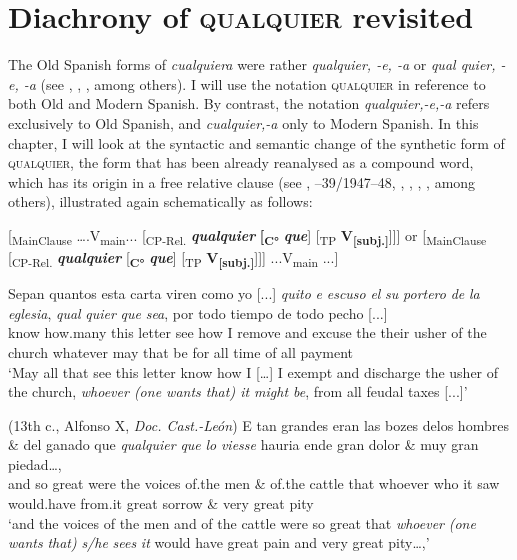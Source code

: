 \chapter{{Diachrony} {of} {\textsc{qualquier} }{revisited}}\label{sec:5}

The Old Spanish forms of \textit{cualquiera} were rather \textit{qualquier, -e, -a} or \textit{qual quier, -e, -a} (see \citealt{cp2009}, \citealt{Pato2012}, \citealt{Mackenzie2019}, among others). I will use the notation \textsc{qualquier} in reference to both Old and Modern Spanish. By contrast, the notation \textit{qualquier,-e,-a} refers exclusively to Old Spanish, and \textit{cualquier,-a} only to Modern Spanish. In this chapter, I will look at the syntactic and semantic change of the synthetic form of \textsc{qualquier}, the form that has been already reanalysed as a compound word, which has its origin in a free relative clause (see \citealt{Palomo1934}, \citealt{Lombard1938}–39/1947–48, \citealt{Meier1950}, \citealt{Rivero1988}, \cite{Espinosa2006}, \citealt{cp2009}, among others), illustrated again schematically as follows:

\ea \label{ex:key:272} %
\ea{} \label{ex:key:272-1}  [\textsubscript{MainClause} ….V\textsubscript{main}... [\textsubscript{CP-Rel.} \textbf{\textit{qualquier} }\textbf{[\textsubscript{C°}} \textbf{\textit{que}}] [\textsubscript{TP} \textbf{V\textsubscript{[subj.]}}]]] or
\ex{} \label{ex:key:272-2}  [\textsubscript{MainClause} [\textsubscript{CP-Rel.} \textbf{\textit{qualquier} }[\textbf{\textsubscript{C°}} \textbf{\textit{que}}] [\textsubscript{TP} \textbf{V\textsubscript{[subj.]}}]]] ...V\textsubscript{main} ...]
\z
\z

\ea \label{ex:key:273}
\ea \label{ex:key:273-1}
\gll Sepan quantos esta carta viren como {yo [...]} \textit{quito} \textit{e} \textit{escuso} \textit{el} \textit{su} \textit{portero} \textit{de} \textit{la} \textit{eglesia}, \textit{qual} \textit{quier} \textit{que} \textit{sea}, por todo tiempo de todo pecho [...]\\
know how.many this letter see how I remove and excuse the their usher of the church whatever may that be for all time of all payment\\
    \glt ‘May all that see this letter know how I […] I exempt and discharge the usher of the church, \textit{whoever (one wants that) it might be}, from all feudal taxes [...]’

    (13th c., Alfonso X, \textit{Doc. Cast.-León})
\ex \label{ex:key:273-2}
\gll E tan grandes eran las bozes delos hombres \& del ganado que \textit{qualquier} \textit{que} \textit{lo} \textit{viesse} hauria ende gran dolor \& muy gran piedad…,\\
and so great were the voices of.the men \& of.the cattle that whoever who it saw would.have from.it great sorrow \& very great pity\\
    \glt ‘and the voices of the men and of the cattle were so great that \textit{whoever} \textit{(one} \textit{wants} \textit{that)} \textit{s/he} \textit{sees} \textit{it} would have great pain and very great pity…,’


